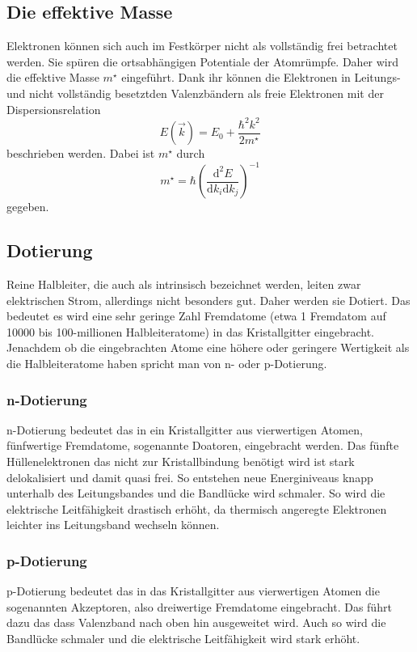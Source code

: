 \subsection{Die effektive Masse}
\label{sec:effektiveMasse}
Elektronen können sich auch im Festkörper nicht als vollständig frei betrachtet werden. Sie spüren die 
ortsabhängigen Potentiale der Atomrümpfe. Daher wird die effektive Masse $m^{\star}$ eingeführt. 
Dank ihr können die Elektronen in Leitungs- und nicht vollständig besetztden Valenzbändern als freie Elektronen
mit der Dispersionsrelation
\begin{equation}
  \label{eq:dispersionsrelation}
  E(\vec{k})=E_0+\frac{\hbar^2k^2}{2m^{\star}}
\end{equation}
beschrieben werden. Dabei ist $m^{\star}$ durch 
\begin{equation}
  m^{\star}=\hbar(\frac{\mathrm{d}^2E}{\mathrm{d}k_i\mathrm{d}k_j})^{-1}
\end{equation}
gegeben.
\subsection{Dotierung}
\label{sec:dotierung}
Reine Halbleiter, die auch als intrinsisch bezeichnet werden, leiten zwar elektrischen Strom, allerdings nicht
besonders gut. Daher werden sie Dotiert. Das bedeutet es wird eine sehr geringe Zahl Fremdatome (etwa 1 
Fremdatom auf 10000 bis 100-millionen Halbleiteratome) in das Kristallgitter eingebracht. Jenachdem ob die 
eingebrachten Atome eine höhere oder geringere Wertigkeit als die Halbleiteratome haben spricht man von 
n- oder p-Dotierung.
\subsubsection{n-Dotierung}
\label{sec:ndotierung}
n-Dotierung bedeutet das in ein Kristallgitter aus vierwertigen Atomen, fünfwertige Fremdatome,
sogenannte Doatoren, eingebracht werden. Das fünfte Hüllenelektronen das nicht zur Kristallbindung
benötigt wird ist stark delokalisiert und damit quasi frei. So entstehen neue Energiniveaus knapp unterhalb
des Leitungsbandes und die Bandlücke wird schmaler. So wird die elektrische Leitfähigkeit drastisch erhöht, 
da thermisch angeregte Elektronen leichter ins Leitungsband wechseln können.
\subsubsection{p-Dotierung}
\label{sec:pdotierung}
p-Dotierung bedeutet das in das Kristallgitter aus vierwertigen Atomen die sogenannten Akzeptoren, also
dreiwertige Fremdatome eingebracht. Das führt dazu das dass Valenzband nach oben hin ausgeweitet wird.
Auch so wird die Bandlücke schmaler und die elektrische Leitfähigkeit wird stark erhöht.
